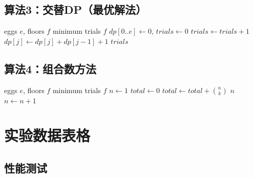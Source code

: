 \documentclass[12pt,a4paper]{article}
\begin{document}
\subsection*{算法3：交替DP（最优解法）}
\begin{algorithm}[H]
\caption{Alternative DP: $O(e \cdot \mathrm{answer})$ time, $O(e)$ space}
\begin{algorithmic}[1]
\REQUIRE eggs $e$, floors $f$
\ENSURE minimum trials
  \ENDIF
{} \RETURN $f$ \ENDIF
\STATE $dp[0..e] \leftarrow 0$, $trials \leftarrow 0$
    \STATE $trials \leftarrow trials + 1$
        \STATE $dp[j] \leftarrow dp[j] + dp[j-1] + 1$
    \ENDFOR
\ENDWHILE
\RETURN $trials$
\end{algorithmic}
\end{algorithm}

\subsection*{算法4：组合数方法}
\begin{algorithm}[H]
\caption{Binomial Method: $O(\mathrm{answer} \cdot \min(e, \mathrm{answer}))$ time, $O(1)$ space}
\begin{algorithmic}[1]
\REQUIRE eggs $e$, floors $f$
\ENSURE minimum trials
  \ENDIF
{} \RETURN $f$ \ENDIF
\STATE $n \leftarrow 1$
    \STATE $total \leftarrow 0$
        \STATE $total \leftarrow total + \binom{n}{k}$
         \RETURN $n$ \ENDIF
    \ENDFOR
    \STATE $n \leftarrow n + 1$
\ENDWHILE
\end{algorithmic}
\end{algorithm}

\newpage


\section*{实验数据表格}

\subsection*{性能测试}
\end{document}
